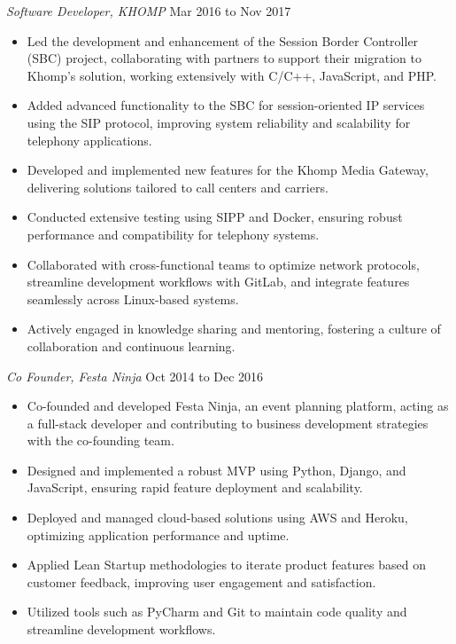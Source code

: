 \documentclass[line,margin]{res}
\begin{document}
\begin{resume}
                {\sl Software Developer, KHOMP} \hfill Mar 2016 to Nov 2017 \\
                 \begin{itemize}  \itemsep -2pt
                 \item Led the development and enhancement of the Session Border Controller (SBC) project, collaborating with partners to support their migration to Khomp's solution, working extensively with C/C++, JavaScript, and PHP.
                 \item Added advanced functionality to the SBC for session-oriented IP services using the SIP protocol, improving system reliability and scalability for telephony applications.
                 \item Developed and implemented new features for the Khomp Media Gateway, delivering solutions tailored to call centers and carriers.
                 \item Conducted extensive testing using SIPP and Docker, ensuring robust performance and compatibility for telephony systems.
                 \item Collaborated with cross-functional teams to optimize network protocols, streamline development workflows with GitLab, and integrate features seamlessly across Linux-based systems.
                 \item Actively engaged in knowledge sharing and mentoring, fostering a culture of collaboration and continuous learning.
                \end{itemize}

                {\sl Co Founder, Festa Ninja} \hfill Oct 2014 to Dec 2016 \\
                 \begin{itemize}  \itemsep -2pt
                 \item Co-founded and developed Festa Ninja, an event planning platform, acting as a full-stack developer and contributing to business development strategies with the co-founding team.
                 \item Designed and implemented a robust MVP using Python, Django, and JavaScript, ensuring rapid feature deployment and scalability.
                 \item Deployed and managed cloud-based solutions using AWS and Heroku, optimizing application performance and uptime.
                 \item Applied Lean Startup methodologies to iterate product features based on customer feedback, improving user engagement and satisfaction.
                 \item Utilized tools such as PyCharm and Git to maintain code quality and streamline development workflows.             


\end{itemize}
\end{resume}
\end{document}
